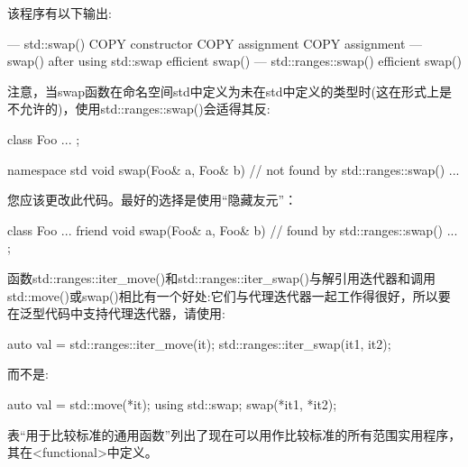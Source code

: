 该程序有以下输出:

\begin{shell}
--- std::swap()
COPY constructor
COPY assignment
COPY assignment
--- swap() after using std::swap
efficient swap()
--- std::ranges::swap()
efficient swap()
\end{shell}

注意，当swap函数在命名空间std中定义为未在std中定义的类型时(这在形式上是不允许的)，使用std::ranges::swap()会适得其反:

\begin{cpp}
class Foo {
	...
};

namespace std {
	void swap(Foo& a, Foo& b) { // not found by std::ranges::swap()
		...
	}
}
\end{cpp}

您应该更改此代码。最好的选择是使用“隐藏友元”：

\begin{cpp}
class Foo {
	...
	friend void swap(Foo& a, Foo& b) { // found by std::ranges::swap()
		...
	}
};
\end{cpp}

函数std::ranges::iter\_move()和std::ranges::iter\_swap()与解引用迭代器和调用std::move()或swap()相比有一个好处:它们与代理迭代器一起工作得很好，所以要在泛型代码中支持代理迭代器，请使用:

\begin{cpp}
auto val = std::ranges::iter_move(it);
std::ranges::iter_swap(it1, it2);
\end{cpp}

而不是:

\begin{cpp}
auto val = std::move(*it);
using std::swap;
swap(*it1, *it2);
\end{cpp}


表“用于比较标准的通用函数”列出了现在可以用作比较标准的所有范围实用程序，其在<functional>中定义。


